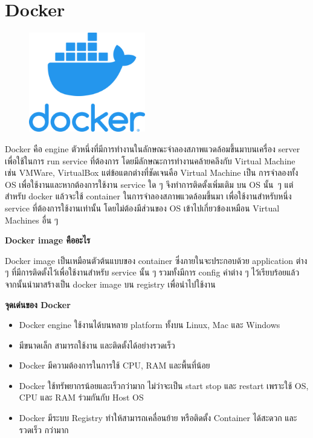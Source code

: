 \section{Docker}
\label{Dart}
\begin{figure}[!thb]
	\captionsetup{justification=centering}
	\centering
	\includegraphics[width=2in]{figures/docker.png}
	\label{fig: docker}
\end{figure}
Docker คือ engine ตัวหนึ่งที่มีการทำงานในลักษณะจำลองสภาพแวดล้อมขึ้นมาบนเครื่อง server เพื่อใช้ในการ run service ที่ต้องการ โดยมีลักษณะการทำงานคล้ายคลึงกับ Virtual Machine เช่น VMWare, VirtualBox แต่ข้อแตกต่างที่ชัดเจนคือ Virtual Machine เป็น การจำลองทั้ง OS เพื่อใช้งานและหากต้องการใช้งาน service ใด ๆ จึงทำการติดตั้ง\mbox{เพิ่มเติม} บน OS \mbox{นั้น ๆ} แต่สำหรับ docker แล้วจะใช้ container ในการจำลองสภาพแวดล้อมขึ้นมา เพื่อใช้งาน\mbox{สำหรับ}หนึ่ง service ที่ต้องการใช้งานเท่านั้น โดยไม่ต้องมีส่วนของ OS เข้าไปเกี่ยวข้องเหมือน Virtual Machines อื่น ๆ
\begin{flushleft}
	\textbf{Docker image คืออะไร}
\end{flushleft}
Docker image เป็นเหมือนตัวต้นแบบของ container ซึ่งภายในจะประกอบด้วย application ต่าง ๆ ที่มีการติดตั้งไว้เพื่อใช้งานสำหรับ service นั้น ๆ รวมทั้งมีการ config ค่าต่าง ๆ ไว้เรียบร้อยแล้ว จากนั้นนำมาสร้างเป็น docker image บน registry เพื่อนำไปใช้งาน
\newpage

\begin{flushleft}
	\textbf{จุดเด่นของ Docker}
\end{flushleft}
\begin{itemize}
	\item Docker engine ใช้งานได้บนหลาย platform ทั้งบน Linux, Mac และ Windows
	\item มีขนาดเล็ก สามารถใช้งาน และติดตั้งได้อย่างรวดเร็ว
	\item Docker มีความต้องการในการใช้ CPU, RAM และพื้นที่น้อย
	\item Docker ใช้ทรัพยากรน้อยและเร็วกว่ามาก ไม่ว่าจะเป็น start stop และ restart เพราะใช้ OS, CPU และ RAM ร่วมกันกับ Host OS
	\item Docker มีระบบ Registry ทำให้สามารถเคลื่อนย้าย หรือติดตั้ง Container ได้สะดวก และ\mbox{รวดเร็ว} กว่ามาก
\end{itemize}
\newpage

